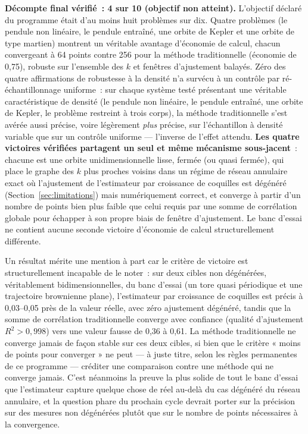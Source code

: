 \documentclass[11pt,a4paper]{article}
\begin{document}
\textbf{Décompte final vérifié~: 4 sur 10 (objectif non atteint).}
L'objectif déclaré du programme était d'au moins huit problèmes sur dix.
Quatre problèmes (le pendule non linéaire, le pendule entraîné, une orbite
de Kepler et une orbite de type martien) montrent un véritable avantage
d'économie de calcul, chacun convergeant à 64 points contre 256 pour la
méthode traditionnelle (économie de 0,75), robuste sur l'ensemble des $k$
et fenêtres d'ajustement balayés. Zéro des quatre affirmations de
robustesse à la densité n'a survécu à un contrôle par ré-échantillonnage
uniforme~: sur chaque système testé présentant une véritable
caractéristique de densité (le pendule non linéaire, le pendule entraîné,
une orbite de Kepler, le problème restreint à trois corps), la méthode
traditionnelle s'est avérée aussi précise, voire légèrement \emph{plus}
précise, sur l'échantillon à densité variable que sur un contrôle
uniforme --- l'inverse de l'effet attendu. \textbf{Les quatre victoires
vérifiées partagent un seul et même mécanisme sous-jacent}~: chacune est
une orbite unidimensionnelle lisse, fermée (ou quasi fermée), qui place le
graphe des $k$ plus proches voisins dans un régime de réseau annulaire
exact où l'ajustement de l'estimateur par croissance de coquilles est
dégénéré (Section~\ref{sec:limitations}) mais numériquement correct, et
converge à partir d'un nombre de points bien plus faible que celui requis
par une somme de corrélation globale pour échapper à son propre biais de
fenêtre d'ajustement. Le banc d'essai ne contient aucune seconde victoire
d'économie de calcul structurellement différente.

Un résultat mérite une mention à part car le critère de victoire est
structurellement incapable de le noter~: sur deux cibles non dégénérées,
véritablement bidimensionnelles, du banc d'essai (un tore quasi périodique
et une trajectoire brownienne plane), l'estimateur par croissance de
coquilles est précis à 0,03--0,05 près de la valeur réelle, avec zéro
ajustement dégénéré, tandis que la somme de corrélation traditionnelle
converge avec confiance (qualité d'ajustement $R^2 > 0{,}998$) vers une
valeur fausse de 0,36 à 0,61. La méthode traditionnelle ne converge
jamais de façon stable sur ces deux cibles, si bien que le critère
« moins de points pour converger » ne peut --- à juste titre, selon les
règles permanentes de ce programme --- créditer une comparaison contre
une méthode qui ne converge jamais. C'est néanmoins la preuve la plus
solide de tout le banc d'essai que l'estimateur capture quelque chose de
réel au-delà du cas dégénéré du réseau annulaire, et la question phare du
prochain cycle devrait porter sur la précision sur des mesures non
dégénérées plutôt que sur le nombre de points nécessaires à la
convergence.
\end{document}
